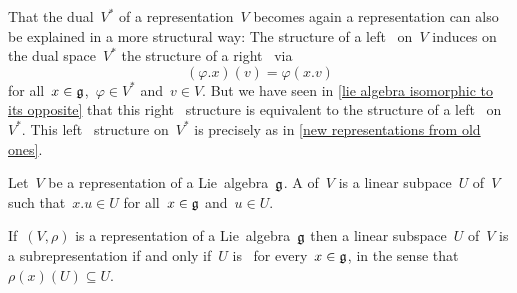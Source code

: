 \begin{remark}
  That the dual~$V^*$ of a representation~$V$ becomes again a representation can also be explained in a more structural way:
  The structure of a left~{\representation{$\glie$}} on~$V$ induces on the dual space~$V^*$ the structure of a right~{\representation{$\glie$}} via
  \[
    (\varphi.x)(v)
    =
    \varphi(x.v)
  \]
  for all~$x \in \mathfrak{g}$,~$\varphi \in V^*$ and~$v \in V$.
  But we have seen in \cref{lie algebra isomorphic to its opposite} that this right~{\representation{$\glie$}} structure is equivalent to the structure of a left~{\representation{$\glie$}} on~$V^*$.
  This left~{\representation{$\glie$}} structure on~$V^*$ is precisely as in \cref{new representations from old ones}.
\end{remark}


\begin{definition}
  Let~$V$ be a representation of a Lie~algebra~$\glie$.
  A  of~$V$ is a linear subpace~$U$ of~$V$ such that~$x.u \in U$ for all~$x \in \mathfrak{g}$ and~$u \in U$.
\end{definition}


\begin{remark}
  If~$(V, \rho)$ is a representation of a Lie~algebra~$\glie$ then a linear subspace~$U$ of~$V$ is a subrepresentation if and only if~$U$ is~{} for every~$x \in \mathfrak{g}$, in the sense that~$\rho(x)(U) \subseteq U$.
\end{remark}


